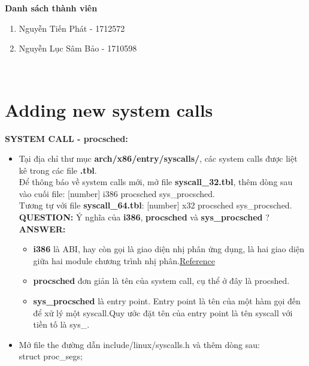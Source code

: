 \documentclass[a4paper]{article}
\begin{document}
\newpage
\textbf{\Large Danh sách thành viên}
\begin{enumerate}{}  
\item \large Nguyễn Tiến Phát - 1712572
\item \large  Nguyễn Lục Sâm Bảo - 1710598
\end{enumerate}
\\
\newpage \tableofcontents

\newpage

\section{Adding new system calls}
\textbf{SYSTEM CALL - procsched:}
\begin{itemize}
\item Tại địa chỉ thư mục\textbf{ arch/x86/entry/syscalls/}, các system calls được liệt kê trong các file \textbf{.tbl}.\\
Để thông báo về system calls mới, mở file\textbf{ syscall\_32.tbl}, thêm dòng sau vào cuối file: [number] i386 procsched sys\_procsched.\\
Tương tự với file \textbf{syscall\_64.tbl}: [number] x32 procsched sys\_procsched.\\
\textbf{QUESTION:} Ý nghĩa của \textbf{i386}, \textbf{procsched} và \textbf{sys\_procsched} ?\\
\textbf{ANSWER:}
\begin{itemize}
    \item \textbf{i386} là ABI, hay còn gọi là giao diện nhị phân ứng dụng, là hai giao diện giữa hai module chương trình nhị phân.\href{https://en.wikipedia.org/wiki/Application_binary_interface}{Reference}
    \item \textbf{procsched} đơn giản là tên của system call, cụ thể ở đây là procshed.
    \item \textbf{sys\_procsched} là entry point. Entry point là tên của một hàm gọi đến để xử lý một syscall.Quy ước đặt tên của entry point là tên syscall với tiền tố là sys\_.
\end{itemize}
\item Mở file the đường dẫn include/linux/syscalls.h và thêm dòng sau:
     \\
{{\color{blue} struct} proc\_segs;}\\
\\

\end{itemize}
\end{document}
